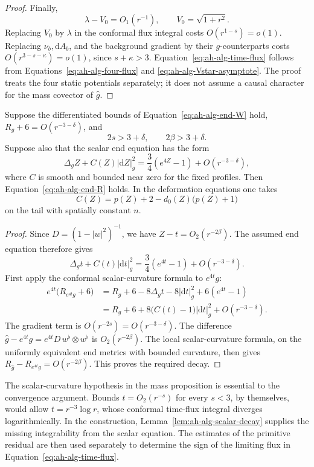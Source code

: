 \begin{proof}
Finally,
\[
 \lambda-V_0=O_1(r^{-1}),\qquad V_0=\sqrt{1+r^2}.
\]
Replacing \(V_0\) by \(\lambda\) in the conformal flux integral costs
\(O(r^{1-s})=o(1)\).  Replacing \(\nu_b,\mathrm dA_b\), and the
background gradient by their \(g\)-counterparts costs
\(O(r^{3-s-\kappa})=o(1)\), since \(s+\kappa>3\).
Equation~\eqref{eq:ah-alg-time-flux} follows from
Equations~\eqref{eq:ah-alg-four-flux} and
\eqref{eq:ah-alg-Vstar-asymptote}.  The proof treats the four static
potentials separately; it does not assume a causal character for the
mass covector of \(\widehat g\).
\end{proof}

\begin{lemma}
\label{lem:ah-alg-scalar-decay}
Suppose the differentiated bounds of
Equation~\eqref{eq:ah-alg-end-W} hold,
\(R_g+6=O(r^{-3-\delta})\), and
\[
 2s>3+\delta,\qquad 2\beta>3+\delta.
\]
Suppose also that the scalar end equation has the form
\begin{equation}
 \Delta_gZ+C(Z)|\mathrm dZ|_g^2
      =\frac34(e^{4Z}-1)+O(r^{-3-\delta}),
 \label{eq:ah-alg-end-equation}
\end{equation}
where \(C\) is smooth and bounded near zero for the fixed profiles.
Then Equation~\eqref{eq:ah-alg-end-R} holds.  In the deformation
equations one takes
\[
 C(Z)=p(Z)+2-d_0(Z)\bigl(p(Z)+1\bigr)
\]
on the tail with spatially constant \(n\).
\end{lemma}

\begin{proof}
Since \(D=(1-|w|^2)^{-1}\), we have
\(Z-t=O_2(r^{-2\beta})\).  The assumed end equation therefore gives
\[
 \Delta_gt+C(t)|\mathrm dt|_g^2
      =\frac34(e^{4t}-1)+O(r^{-3-\delta}).
\]
First apply the conformal scalar-curvature formula to \(e^{4t}g\):
\begin{align*}
 e^{4t}\bigl(R_{e^{4t}g}+6\bigr)
   &=R_g+6-8\Delta_gt-8|\mathrm dt|_g^2+6(e^{4t}-1)\\
   &=R_g+6+8\bigl(C(t)-1\bigr)|\mathrm dt|_g^2
                                      +O(r^{-3-\delta}).
\end{align*}
The gradient term is \(O(r^{-2s})=O(r^{-3-\delta})\).
The difference
\(\widehat g-e^{4t}g=e^{4t}D\,w^\flat\otimes w^\flat\)
is \(O_2(r^{-2\beta})\).  The local scalar-curvature formula,
on the uniformly equivalent end metrics with bounded curvature,
then gives
\(R_{\widehat g}-R_{e^{4t}g}=O(r^{-2\beta})\).
This proves the required decay.
\end{proof}

\begin{remark}
The scalar-curvature hypothesis in the mass proposition is essential
to the convergence argument.  Bounds \(t=O_2(r^{-s})\) for every
\(s<3\), by themselves, would allow \(t=r^{-3}\log r\), whose
conformal time-flux integral diverges logarithmically.  In the
construction, Lemma~\ref{lem:ah-alg-scalar-decay} supplies the missing
integrability from the scalar equation.  The estimates of the
primitive residual are then used separately to determine the sign of
the limiting flux in Equation~\eqref{eq:ah-alg-time-flux}.
\end{remark}
